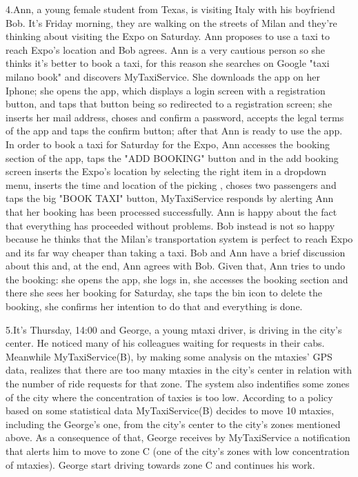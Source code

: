 \documentclass[11pt]{article} %
\begin{document}
    4.Ann, a young female student from Texas, is visiting Italy with his boyfriend Bob.
      It's Friday morning, they are walking on the streets of Milan and they're thinking
      about visiting the Expo on Saturday. Ann proposes to use a taxi to reach Expo's location and
      Bob agrees. Ann is a very cautious person so she thinks it's better to book a taxi, for this
      reason she searches on Google "taxi milano book" and discovers MyTaxiService.
      She downloads the app on her Iphone; she opens the app, which displays a login screen with
      a registration button, and taps that button being so redirected to a registration screen; she inserts
      her mail address, choses and confirm a password, accepts the legal
      terms of the app and taps the confirm button; after that Ann is ready to use the app.
      In order to book a taxi for Saturday for the Expo, Ann accesses the booking section of the app,
      taps the "ADD BOOKING" button and in the add booking screen inserts the Expo's location by selecting the right item in a dropdown menu, inserts the time and location of the picking
      , choses two passengers and taps the big "BOOK TAXI" button, MyTaxiService responds by alerting Ann that her booking
      has been processed successfully. Ann is happy about the fact that everything has proceeded without problems.
      Bob instead is not so happy because he thinks that the Milan's transportation system is perfect
      to reach Expo and its far way cheaper than taking a taxi. Bob and Ann have a brief discussion
      about this and, at the end, Ann agrees with Bob. Given that, Ann tries to undo the booking:
      she opens the app, she logs in, she accesses the booking section and there she sees her booking for Saturday, she taps
      the bin icon to delete the booking, she confirms her intention to do that and everything is done.

    5.It's Thursday, 14:00 and George, a young mtaxi driver, is driving in the city's center.
       He noticed many of his colleagues waiting for requests in their cabs.
       Meanwhile MyTaxiService(B), by making some analysis on the mtaxies' GPS data, realizes that there are too many mtaxies
       in the city's center in relation with the number of ride requests for that zone. The system also indentifies
       some zones of the city where the concentration of taxies is too low. According to a policy based on some statistical data
       MyTaxiService(B) decides to move 10 mtaxies, including the George's one, from the city's center to the city's zones mentioned above.
       As a consequence of that, George receives by MyTaxiService a notification that alerts him to move to zone C (one of the city's zones
       with low concentration of mtaxies). George start driving towards zone C and continues his work.
\end{document}
